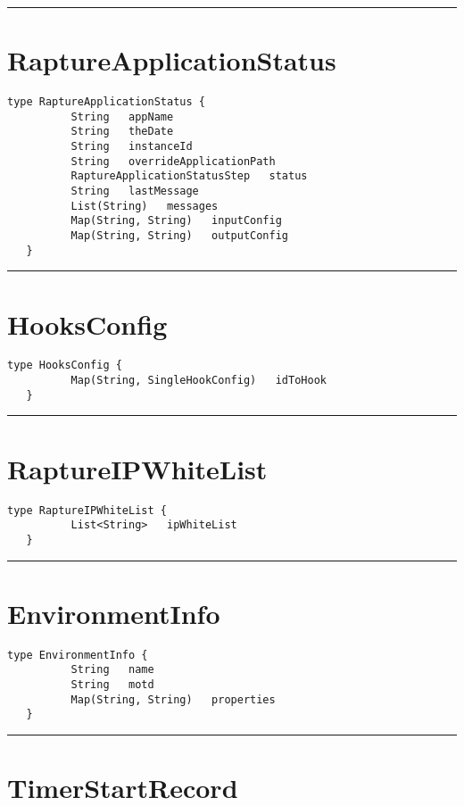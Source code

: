 \rule{12cm}{2pt}
\section{RaptureApplicationStatus}
\label{type:RaptureApplicationStatus}

\begin{lstlisting}[style=nonumbers]
   type RaptureApplicationStatus {
          String   appName
          String   theDate
          String   instanceId
          String   overrideApplicationPath
          RaptureApplicationStatusStep   status
          String   lastMessage
          List(String)   messages
          Map(String, String)   inputConfig
          Map(String, String)   outputConfig
   }
\end{lstlisting}

\rule{12cm}{2pt}
\section{HooksConfig}
\label{type:HooksConfig}

\begin{lstlisting}[style=nonumbers]
   type HooksConfig {
          Map(String, SingleHookConfig)   idToHook
   }
\end{lstlisting}

\rule{12cm}{2pt}
\section{RaptureIPWhiteList}
\label{type:RaptureIPWhiteList}

\begin{lstlisting}[style=nonumbers]
   type RaptureIPWhiteList {
          List<String>   ipWhiteList
   }
\end{lstlisting}

\rule{12cm}{2pt}
\section{EnvironmentInfo}
\label{type:EnvironmentInfo}

\begin{lstlisting}[style=nonumbers]
   type EnvironmentInfo {
          String   name
          String   motd
          Map(String, String)   properties
   }
\end{lstlisting}

\rule{12cm}{2pt}
\section{TimerStartRecord}
\label{type:TimerStartRecord}

